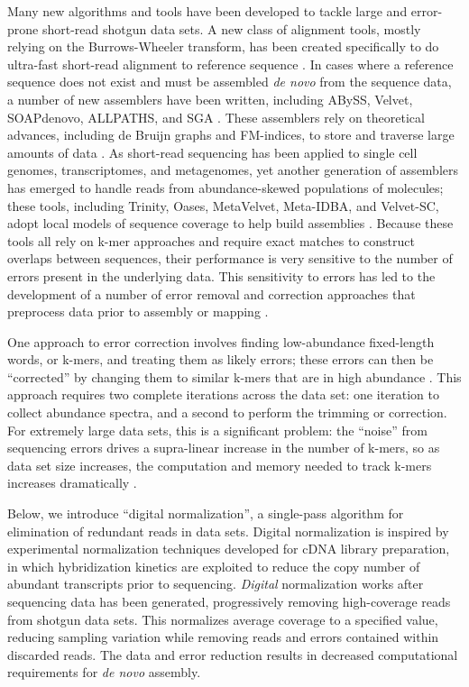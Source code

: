 \documentclass[10pt]{article}
\begin{document}
Many new algorithms and tools have been developed to tackle large and
error-prone short-read shotgun data sets. A new class of alignment
tools, mostly relying on the Burrows-Wheeler transform, has been
created specifically to do ultra-fast short-read alignment to
reference sequence \cite{pubmed19430453}.  In cases where a reference
sequence does not exist and must be assembled {\em de novo} from the
sequence data, a number of new assemblers have been written, including
ABySS, Velvet, SOAPdenovo, ALLPATHS, and SGA
\cite{pubmed20211242,pubmed21187386,pubmed22156294}.  These assemblers
rely on theoretical advances, including de Bruijn graphs and
FM-indices, to store and traverse large amounts of data
\cite{pubmed22068540,pubmed20529929}.  As short-read sequencing has
been applied to single cell genomes, transcriptomes, and metagenomes,
yet another generation of assemblers has emerged to handle reads from
abundance-skewed populations of molecules; these tools, including
Trinity, Oases, MetaVelvet, Meta-IDBA, and Velvet-SC, adopt local
models of sequence coverage to help build assemblies
\cite{pubmed21572440,pubmed22368243,metavelvet,pubmed21685107,pubmed21926975}.
Because these tools all rely on k-mer approaches and require exact
matches to construct overlaps between sequences, their performance is
very sensitive to the number of errors present in the underlying data.
This sensitivity to errors has led to the development of a number of
error removal and correction approaches that preprocess data prior to
assembly or mapping
\cite{pubmed21685062,pubmed15059830,pubmed21114842}.

One approach to error correction involves finding low-abundance
fixed-length words, or k-mers, and treating them as likely errors;
these errors can then be ``corrected'' by changing them to similar
k-mers that are in high abundance \cite{pubmed21114842}.  This
approach requires two complete iterations across the data set: one
iteration to collect abundance spectra, and a second to perform the
trimming or correction.  For extremely large data sets, this is a
significant problem: the ``noise'' from sequencing errors drives a
supra-linear increase in the number of k-mers, so as data set size
increases, the computation and memory needed to track k-mers increases
dramatically \cite{pubmed21245053}.


Below, we introduce ``digital normalization'', a single-pass algorithm
for elimination of redundant reads in data sets.  Digital
normalization is inspired by experimental normalization techniques
developed for cDNA library preparation, in which hybridization
kinetics are exploited to reduce the copy number of abundant
transcripts prior to sequencing\cite{pubmed8889548,pubmed7937745}.
{\em Digital} normalization works after sequencing data has been
generated, progressively removing high-coverage reads from shotgun
data sets.  This normalizes average coverage to a specified value,
reducing sampling variation while removing reads and errors contained
within discarded reads.  The data and error reduction results in
decreased computational requirements for {\em de novo} assembly.
\end{document}
